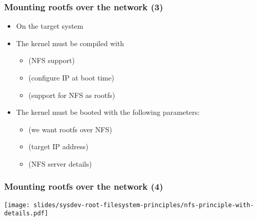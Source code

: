 \begin{frame}
  \frametitle{Mounting rootfs over the network (3)}
  \begin{itemize}
  \item On the target system
  \item The kernel must be compiled with
    \begin{itemize}
    \item {} (NFS support)
    \item {} (configure IP at boot time)
    \item {} (support for NFS as rootfs)
    \end{itemize}
  \item The kernel must be booted with the following parameters:
    \begin{itemize}
    \item {} (we want rootfs over NFS)
    \item {} (target IP address)
    \item {} (NFS server details)
    \end{itemize}
  \end{itemize}
\end{frame}

\begin{frame}
  \frametitle{Mounting rootfs over the network (4)}
  \begin{center}
    \texttt{[image: slides/sysdev-root-filesystem-principles/nfs-principle-with-details.pdf]}
  \end{center}
\end{frame}

